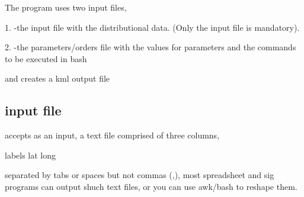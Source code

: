 The program uses two input files,



1. -the input file with the distributional data. (Only the input file is mandatory).
	
	
2. -the parameters/orders file with the values for parameters and the commands to be executed in bash 
	

	
and creates a kml output file


\subsection*{\MT input file}

\MT accepts as an input, a text file comprised of three columns,
	
	labels   lat   long
	

separated by tabs or spaces but not commas (,), most spreadsheet and sig programs can output shuch text files, or you can use awk/bash to reshape them. 


\label{valid_data_set}

\vspace{-7\baselineskip}
\vspace{7\baselineskip}
	
